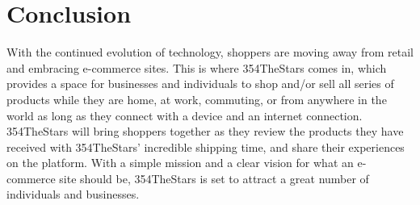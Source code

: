 \documentclass[11pt]{article}
\begin{document}
\section{Conclusion}

With the continued evolution of technology, shoppers are moving away from retail
and embracing e-commerce sites. This is where 354TheStars comes in, which provides
a space for businesses and individuals to shop and/or sell all series of products
while they are home, at work, commuting, or from anywhere in the world as long
as they connect with a device and an internet connection. 354TheStars will bring
shoppers together as they review the products they have received with 354TheStars'
incredible shipping time, and share their experiences on the platform. With a
simple mission and a clear vision for what an e-commerce site should be, 354TheStars
is set to attract a great number of individuals and businesses.

\appendix
\end{document}
